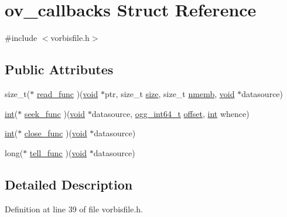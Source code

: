 \hypertarget{structov__callbacks}{}\section{ov\+\_\+callbacks Struct Reference}
\label{structov__callbacks}


{\ttfamily \#include $<$vorbisfile.\+h$>$}

\subsection*{Public Attributes}
\begin{DoxyCompactItemize}
\item 
size\+\_\+t($\ast$ \hyperlink{structov__callbacks_a301b93b9f0436e5bde6dbdeb0edeae77}{read\+\_\+func} )(\hyperlink{sound_8c_ae35f5844602719cf66324f4de2a658b3}{void} $\ast$ptr, size\+\_\+t \hyperlink{group__lavu__mem_ga854352f53b148adc24983a58a1866d66}{size}, size\+\_\+t \hyperlink{group__lavu__mem_ga79fd723df92f68cf8a6207a1d98b4c01}{nmemb}, \hyperlink{sound_8c_ae35f5844602719cf66324f4de2a658b3}{void} $\ast$datasource)
\item 
\hyperlink{xmltok_8h_a5a0d4a5641ce434f1d23533f2b2e6653}{int}($\ast$ \hyperlink{structov__callbacks_aa49d8079756c1c26e2ba9b974e463dfa}{seek\+\_\+func} )(\hyperlink{sound_8c_ae35f5844602719cf66324f4de2a658b3}{void} $\ast$datasource, \hyperlink{config__types_8h_a292432ede703993aa88db876e11b2306}{ogg\+\_\+int64\+\_\+t} \hyperlink{layer12_8c_a33d71f23ba2052d17f0b754dc35265b0}{offset}, \hyperlink{xmltok_8h_a5a0d4a5641ce434f1d23533f2b2e6653}{int} whence)
\item 
\hyperlink{xmltok_8h_a5a0d4a5641ce434f1d23533f2b2e6653}{int}($\ast$ \hyperlink{structov__callbacks_a4d1141e00251a23b27e1de261e8717ec}{close\+\_\+func} )(\hyperlink{sound_8c_ae35f5844602719cf66324f4de2a658b3}{void} $\ast$datasource)
\item 
long($\ast$ \hyperlink{structov__callbacks_ab078f3f386b7c58e9fab2ede904e0e36}{tell\+\_\+func} )(\hyperlink{sound_8c_ae35f5844602719cf66324f4de2a658b3}{void} $\ast$datasource)
\end{DoxyCompactItemize}


\subsection{Detailed Description}


Definition at line 39 of file vorbisfile.\+h.



